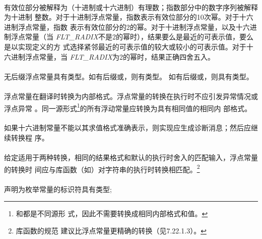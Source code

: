 \semantic
\paragraph{}
有效位部分被解释为（十进制或十六进制）有理数；指数部分中的数字序列被解释为十进制
整数。对于十进制浮点常量，指数表示有效位部分的10次幂。对于十六进制浮点常量，指数
表示有效位部分的2的幂。对于十进制浮点常量，以及十六进制浮点常量（当
\textit{FLT\_RADIX}不是2的幂时），结果要么是最近的可表示值，要么是以实现定义的方
式选择紧邻最近的可表示值的较大或较小的可表示值。对于十六进制浮点常量，当
\textit{FLT\_RADIX}为2的幂时，结果正确四舍五入。

\paragraph{}
无后缀浮点常量具有类型。如有后缀或，则有类型。
如有后缀或，则具有类型。

\paragraph{}
浮点常量在翻译时转换为内部格式。浮点常量的转换在执行时不应引发异常情况或浮点异常
。同一源形式\footnote{和都是不同源形
式，因此不需要转换成相同内部格式和值。}的所有浮动常量应转换为具有相同值的相同内
部格式。

\recprac
\paragraph{}
如果十六进制常量不能以其求值格式准确表示，则实现应生成诊断消息；然后应继续转换程
序。

\paragraph{}
给定适用于两种转换，相同的结果格式和默认的执行时舍入的匹配输入，浮点常量的转换时
间应与库函数（如）对字符串的执行时转换相匹配。\footnote{库函数的规范
建议比浮点常量更精确的转换（见7.22.1.3）。}

\syntax
\paragraph{}

\semantic
\paragraph{}
声明为枚举常量的标识符具有类型;

